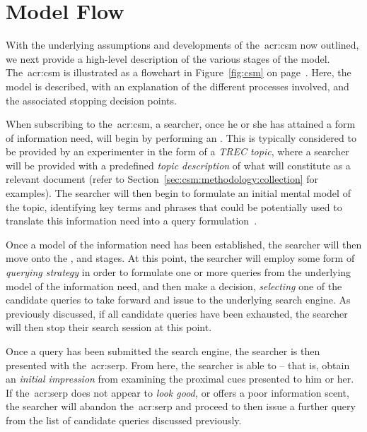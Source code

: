 \section{Model Flow}\label{sec:csm:csm:flow}
With the underlying assumptions and developments of the~\gls{acr:csm} now outlined, we next provide a high-level description of the various stages of the model. The~\gls{acr:csm} is illustrated as a flowchart in Figure~\ref{fig:csm} on page~\pageref{fig:csm}. Here, the model is described, with an explanation of the different processes involved, and the associated stopping decision points.

When subscribing to the~\gls{acr:csm}, a searcher, once he or she has attained a form of information need, will begin by performing an . This is typically considered to be provided by an experimenter in the form of a \emph{TREC topic}, where a searcher will be provided with a predefined \emph{topic description} of what will constitute as a relevant document (refer to Section~\ref{sec:csm:methodology:collection} for examples). The searcher will then begin to formulate an initial mental model of the topic, identifying key terms and phrases that could be potentially used to translate this information need into a query formulation~\citep{borlund2003iir_model}.

Once a model of the information need has been established, the searcher will then move onto the ,  and  stages. At this point, the searcher will employ some form of \emph{querying strategy} in order to formulate one or more queries from the underlying model of the information need, and then make a decision, \emph{selecting} one of the candidate queries to take forward and issue to the underlying search engine. As previously discussed, if all candidate queries have been exhausted, the searcher will then stop their search session at this point.

Once a query has been submitted the search engine, the searcher is then presented with the~\gls{acr:serp}. From here, the searcher is able to  -- that is, obtain an \emph{initial impression} from examining the proximal cues presented to him or her. If the~\gls{acr:serp} does not appear to \emph{look good,} or offers a poor information scent, the searcher will abandon the~\gls{acr:serp} and proceed to then issue a further query from the list of candidate queries discussed previously.

